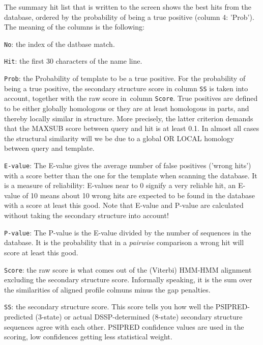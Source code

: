 \documentclass[11pt,a4paper]{article}
\begin{document}
The summary hit list that is written to the screen shows the best hits from the 
database, ordered by the probability of being a true positive (column 4: 'Prob'). 
The meaning of the columns is the following:
\vspace{5mm}

\renewcommand{\arraystretch}{1.2}

\begin{description}
\item{\verb`No`}: the index of the datbase match.

\item{\verb`Hit`}: the first 30 characters of the name line.

\item{\verb`Prob`}: the Probability of template to be a true positive.
For the probability of being a true positive, the secondary structure score 
in column \verb`SS` is taken into account, together with the raw score in\
column \verb`Score`. 
True positives are defined to be either globally homologous or they are at least 
homologous in parts, and thereby locally similar in structure. More precisely, 
the latter criterion demands that the MAXSUB score between query and hit is at 
least 0.1. In almost all cases the structural similarity will we be due to a global
OR LOCAL homology between query and template.

\item{\verb`E-value`}:
The E-value gives the average number of false positives ('wrong hits') with a score 
better than the one for the template when scanning the database. It is a measure of 
reliability: E-values near to 0 signify a very reliable hit, an E-value of 10 means 
about 10 wrong hits are expected to be found in the database with a score at least 
this good. Note that E-value and P-value are calculated without taking the secondary 
structure into account!


\item{\verb`P-value`}: 
The P-value is the E-value divided by the number of sequences in the database.
It is the probability that in a \emph{pairwise} comparison a wrong hit will score at least 
this good.

\item{\verb`Score`}: the raw score is what comes out of the (Viterbi) HMM-HMM alignment excluding
the secondary structure score. Informally speaking, it is the sum over the similarities 
of aligned profile colmuns minus the gap penalties. 

\item{\verb`SS`}: the secondary structure score.
This score tells you how well the PSIPRED-predicted (3-state) or actual DSSP-determined 
(8-state) secondary structure sequences agree with each other. PSIPRED confidence 
values are used in the scoring, low confidences getting less statistical weight.


\end{description}
\end{document}
